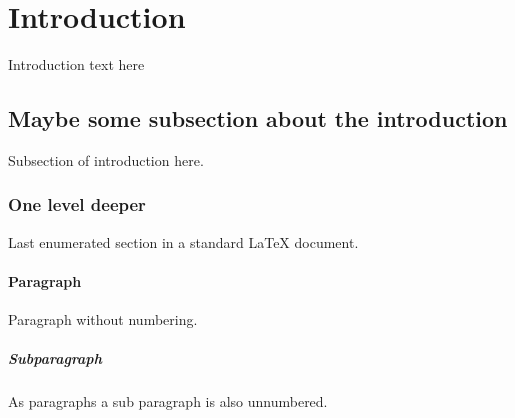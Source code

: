 \documentclass[10pt, a4paper]{article}
\begin{document}
\tableofcontents

\newpage

\section{Introduction}
Introduction text here

\subsection{Maybe some subsection about the introduction}
Subsection of introduction here.

\subsubsection{One level deeper}
Last enumerated section in a standard \LaTeX{} document. %

\paragraph{Paragraph}
Paragraph without numbering.

\subparagraph{Subparagraph}
As paragraphs a sub paragraph is also unnumbered.
\end{document}
